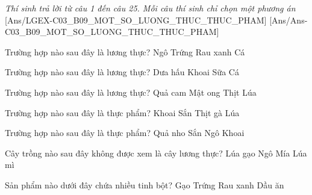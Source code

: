 \documentclass[Main.tex]{subfiles}
\begin{document}
\textit{\large Thí sinh trả lời từ câu 1 đến câu 25. Mỗi câu thí sinh chỉ chọn một phương án}
[Ans/LGEX-C03_B09_MOT_SO_LUONG_THUC_THUC_PHAM]
[Ans/Ans-C03_B09_MOT_SO_LUONG_THUC_THUC_PHAM]

\begin{ex}%
	Trường hợp nào sau đây là lương thực?
	\choice
	{\True Ngô}
	{Trứng}
	{Rau xanh}
	{Cá}
\end{ex}

\begin{ex}%
	Trường hợp nào sau đây là lương thực?
	\choice
	{Dưa hấu}
	{\True Khoai}
	{Sữa}
	{Cá}
\end{ex}

\begin{ex}%
	Trường hợp nào sau đây là lương thực?
	\choice
	{Quả cam}
	{Mật ong}
	{Thịt}
	{\True Lúa}
\end{ex}

\begin{ex}%
	Trường hợp nào sau đây là thực phẩm?
	\choice
	{Khoai}
	{Sắn}
	{\True Thịt gà}
	{Lúa}
\end{ex}

\begin{ex}%
	Trường hợp nào sau đây là thực phẩm?
	\choice
	{\True Quả nho}
	{Sắn}
	{Ngô}
	{Khoai}
\end{ex}

\begin{ex}%
	Cây trồng nào sau đây không được xem là cây lương thực?
	\choice
	{Lúa gạo}
	{Ngô}
	{\True Mía}
	{Lúa mì}
\end{ex}

\begin{ex}%
	Sản phẩm nào dưới đây chứa nhiều tinh bột?
	\choice
	{\True Gạo}
	{Trứng}
	{Rau xanh}
	{Dầu ăn}
\end{ex}
\end{document}
